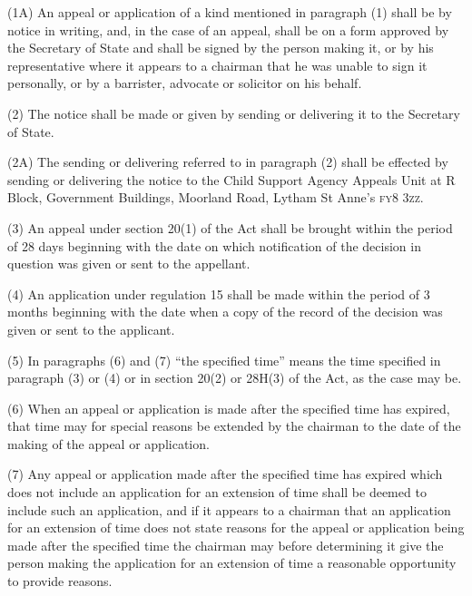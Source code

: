 \documentclass[a4paper]{article}
\begin{document}

(1A) An appeal or application of a kind mentioned in paragraph (1) shall be by notice in writing, and, in the case of an appeal, shall be on a form approved by the Secretary of State and shall be signed by the person making it, or by his representative where it appears to a chairman that he was unable to sign it personally, or by a barrister, advocate or solicitor on his behalf.

(2) The notice shall be made or given by sending or delivering it to the 
Secretary of State.  %

(2A) The sending or delivering referred to in paragraph (2) shall be effected by sending or delivering the notice to the Child Support Agency Appeals Unit at R Block, Government Buildings, Moorland Road, Lytham St Anne’s \textsc{\lowercase{FY8 3ZZ}}.

(3) An appeal under section 20(1) of the Act shall be brought within the period of 28 days beginning with the date on which notification of the decision in question was given or sent to the appellant.

(4) An application under regulation 15 shall be made within the period of 3 months beginning with the date when a copy of the record of the decision was given or sent to the applicant.

(5) In paragraphs (6) and (7) “the specified time” means the time specified in paragraph (3) or
(4) or in section 20(2) or 28H(3) of the Act, as the case may be.  %

(6) When an appeal or application is made after the specified time has expired, that time may for special reasons be extended by the chairman to the date of the making of the appeal or application.

(7) Any appeal or application made after the specified time has expired which does not include an application for an extension of time shall be deemed to include such an application, and if it appears to a chairman that an application for an extension of time does not state reasons for the appeal or application being made after the specified time the chairman may before determining it give the person making the application for an extension of time a reasonable opportunity to provide reasons.
\end{document}
